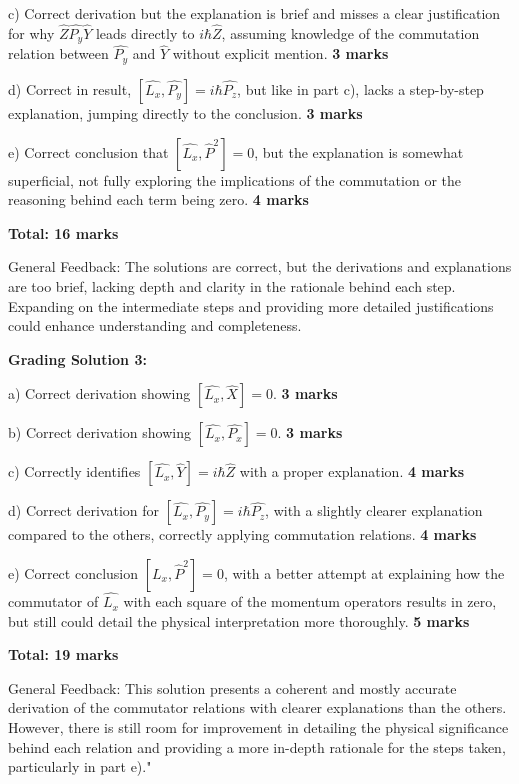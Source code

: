 \documentclass[a4paper,11pt]{article}
\begin{document}
c) Correct derivation but the explanation is brief and misses a clear justification for why \( \hat{Z}\hat{P_{y}}\hat{Y} \) leads directly to \( i\hbar\hat{Z} \), assuming knowledge of the commutation relation between \( \hat{P_{y}} \) and \( \hat{Y} \) without explicit mention. \textbf{3 marks}

d) Correct in result, \( \left[ \hat{L_{x}}, \hat{P_{y}} \right] = i \hbar \hat{P_{z}} \), but like in part c), lacks a step-by-step explanation, jumping directly to the conclusion. \textbf{3 marks}

e) Correct conclusion that \( \left[ \hat{L_{x}}, \hat{P}^{2} \right] = 0 \), but the explanation is somewhat superficial, not fully exploring the implications of the commutation or the reasoning behind each term being zero. \textbf{4 marks}

\textbf{Total: 16 marks}

General Feedback: The solutions are correct, but the derivations and explanations are too brief, lacking depth and clarity in the rationale behind each step. Expanding on the intermediate steps and providing more detailed justifications could enhance understanding and completeness.

\hrulefill

\textbf{Grading Solution 3:}

a) Correct derivation showing \( \left[ \hat{L_{x}}, \hat{X} \right] = 0 \). \textbf{3 marks}

b) Correct derivation showing \( \left[ \hat{L_{x}}, \hat{P_{x}} \right] = 0 \). \textbf{3 marks}

c) Correctly identifies \( \left[ \hat{L_{x}}, \hat{Y} \right] = i \hbar \hat{Z} \) with a proper explanation. \textbf{4 marks}

d) Correct derivation for \( \left[ \hat{L_{x}}, \hat{P_{y}} \right] = i \hbar \hat{P_{z}} \), with a slightly clearer explanation compared to the others, correctly applying commutation relations. \textbf{4 marks}

e) Correct conclusion \( \left[ \hat{L_{x}}, \hat{P}^{2} \right] = 0 \), with a better attempt at explaining how the commutator of \( \hat{L_{x}} \) with each square of the momentum operators results in zero, but still could detail the physical interpretation more thoroughly. \textbf{5 marks}

\textbf{Total: 19 marks}

General Feedback: This solution presents a coherent and mostly accurate derivation of the commutator relations with clearer explanations than the others. However, there is still room for improvement in detailing the physical significance behind each relation and providing a more in-depth rationale for the steps taken, particularly in part e)."
\end{document}
